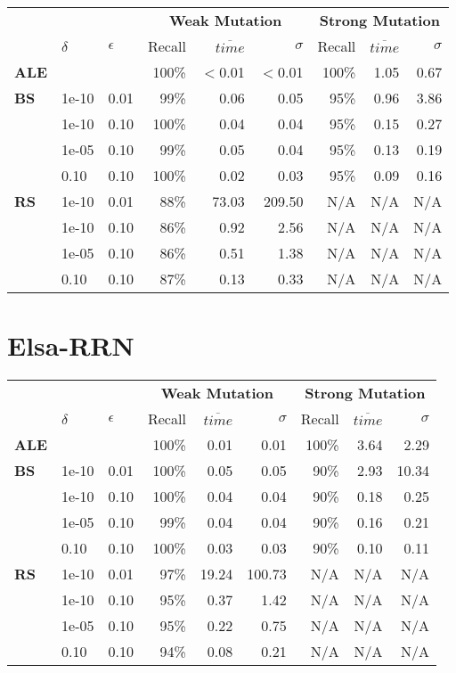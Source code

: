 \begin{small} 
\begin{tabular}{lll|r|r|r|r|r|r} 
 & & & \multicolumn{3}{c|}{\textbf{Weak Mutation}} & \multicolumn{3}{c}{\textbf{Strong Mutation}}\\ 
 & $\delta$ & $\epsilon$ & Recall & $\overline{time}$ & $\sigma$ & Recall & $\overline{time}$ & $\sigma$ \\  
\hline 
\textbf{ALE} & & & 100\% & $<$0.01  & $<$0.01  & 100\% & 1.05  & 0.67  \\ 
\textbf{BS}  & 1e-10  & 0.01  & 99\% & 0.06  & 0.05  & 95\% & 0.96  & 3.86\\
 & 1e-10  & 0.10  & 100\% & 0.04  & 0.04  & 95\% & 0.15  & 0.27\\
 & 1e-05  & 0.10  & 99\% & 0.05  & 0.04  & 95\% & 0.13  & 0.19\\
 & 0.10  & 0.10  & 100\% & 0.02  & 0.03  & 95\% & 0.09  & 0.16\\
\textbf{RS}  & 1e-10  & 0.01  & 88\% & 73.03  & 209.50 & N/A & N/A & N/A \\
 & 1e-10  & 0.10  & 86\% & 0.92  & 2.56 & N/A & N/A & N/A \\
 & 1e-05  & 0.10  & 86\% & 0.51  & 1.38 & N/A & N/A & N/A \\
 & 0.10  & 0.10  & 87\% & 0.13  & 0.33 & N/A & N/A & N/A \\
\end{tabular} 
\end{small} 


\section{Elsa-RRN}

\begin{small} 
\begin{tabular}{lll|r|r|r|r|r|r} 
 & & & \multicolumn{3}{c|}{\textbf{Weak Mutation}} & \multicolumn{3}{c}{\textbf{Strong Mutation}}\\ 
 & $\delta$ & $\epsilon$ & Recall & $\overline{time}$ & $\sigma$ & Recall & $\overline{time}$ & $\sigma$ \\  
\hline 
\textbf{ALE} & & & 100\% & 0.01  & 0.01  & 100\% & 3.64  & 2.29  \\ 
\textbf{BS}  & 1e-10  & 0.01  & 100\% & 0.05  & 0.05  & 90\% & 2.93  & 10.34\\
 & 1e-10  & 0.10  & 100\% & 0.04  & 0.04  & 90\% & 0.18  & 0.25\\
 & 1e-05  & 0.10  & 99\% & 0.04  & 0.04  & 90\% & 0.16  & 0.21\\
 & 0.10  & 0.10  & 100\% & 0.03  & 0.03  & 90\% & 0.10  & 0.11\\
\textbf{RS}  & 1e-10  & 0.01  & 97\% & 19.24  & 100.73 & N/A & N/A & N/A \\
 & 1e-10  & 0.10  & 95\% & 0.37  & 1.42 & N/A & N/A & N/A \\
 & 1e-05  & 0.10  & 95\% & 0.22  & 0.75 & N/A & N/A & N/A \\
 & 0.10  & 0.10  & 94\% & 0.08  & 0.21 & N/A & N/A & N/A \\
\end{tabular} 
\end{small} 


